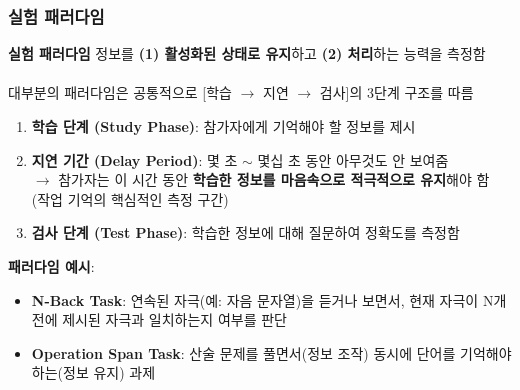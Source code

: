 \documentclass{beamer}
\begin{document}
\subsubsection{실험 패러다임}
\begin{frame}{\textbf{실험 패러다임}}
  정보를 \textbf{(1) 활성화된 상태로 유지}하고 \textbf{(2) 처리}하는 능력을 측정함\\~\\
  대부분의 패러다임은 공통적으로 [학습 $\rightarrow$ 지연 $\rightarrow$ 검사]의 3단계 구조를 따름
  \begin{enumerate}
    \item \textbf{학습 단계 (Study Phase)}: 참가자에게 기억해야 할 정보를 제시
    \item \textbf{지연 기간 (Delay Period)}: 몇 초 $\sim$ 몇십 초 동안 아무것도 안 보여줌\\
      $\rightarrow$ 참가자는 이 시간 동안 \textbf{학습한 정보를 마음속으로 적극적으로 유지}해야 함\\(작업 기억의 핵심적인 측정 구간)
    \item \textbf{검사 단계 (Test Phase)}: 학습한 정보에 대해 질문하여 정확도를 측정함
  \end{enumerate}

  \vspace{0.5em}
  \textbf{패러다임 예시}:
  \vspace{-0.5em}
  \begin{itemize}
    \item \textbf{N-Back Task}: 연속된 자극(예: 자음 문자열)을 듣거나 보면서, 현재 자극이 N개 전에 제시된 자극과 일치하는지 여부를 판단
    \item \textbf{Operation Span Task}: 산술 문제를 풀면서(정보 조작) 동시에 단어를 기억해야하는(정보 유지) 과제
  \end{itemize}
\end{frame}
\end{document}
